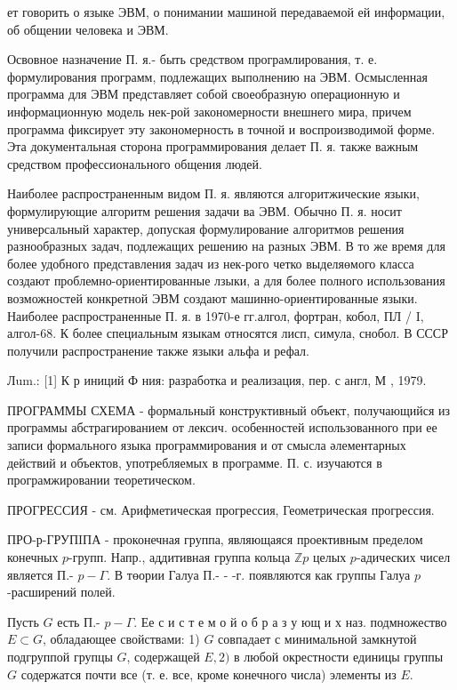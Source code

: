 \documentclass[10pt]{article}
\begin{document}
ет говорить о языке ЭВМ, о понимании машиной передаваемой ей информации, об общении человека и ЭВМ.



Освовное назначение П. я.- быть средством програмлирования, т. е. формулирования программ, подлежащих выполнению на ЭВМ. Осмысленная программа для ЭВМ представляет собой своеобразную операционную и информационную модель нек-рой закономерности внешнего мира, причем программа фиксирует эту закономерность в точной и воспроизводимой форме. Эта документальная сторона программирования делает П. я. также важным средством профессионального общения людей.



Наиболее распространенным видом П. я. являются алгоритжические языки, формулирующие алгоритм решения задачи ва ЭВМ. Обычно П. я. носит универсальный характер, допуская формулирование алгоритмов решения разнообразных задач, подлежащих решению на разных ЭВМ. В то же время для более удобного представления задач из нек-рого четко выделяөмого класса создают проблемно-ориентированные лзыки, а для более полного использования возможностей конкретной ЭВМ создают машинно-ориентированные языки. Наиболее распространенные П. я. в 1970-е гг.алгол, фортран, кобол, ПЛ / I, алгол-68. К более специальным языкам относятся лисп, симула, снобол. В СССР получили распространение также языки альфа и рефал.



Лum.: [1] К р иниций Ф ния: разработка и реализация, пер. с англ, М , 1979.



ПРОГРАММЫ СХЕМА - формальный конструктивный объект, получающийся из программы абстрагированием от лексич. особенностей использованного при ее записи формального языка программирования и от смысла әлементарных действий и объектов, употребляемых в программе. П. с. изучаются в програмжировании теоретическом.



ПРОГРЕССИЯ - см. Арифметическая прогрессия, Геометрическая прогрессия.



ПРО-р-ГРУПIПА - проконечная группа, являющаяся проективным пределом конечных $p$-групп. Напр., аддитивная группа кольца $\mathbb{Z} p$ целых $p$-адических чисел является П.- $p-\Gamma$. В төории Галуа П.- - -г. появляются как группы Галуа $p$-расширений полей.



Пусть $G$ есть П.- $p-\Gamma$. Ее с и с т е м о й о б р а з у ющ и х наз. подмножество $E \subset G$, обладающее свойствами: 1) $G$ совпадает с минимальной замкнутой подгруппой групцы $G$, содержащей $E, 2)$ в любой окрестности единицы группы $G$ содержатся почти все (т. е. все, кроме конечного числа) элементы из $E$.
\end{document}
